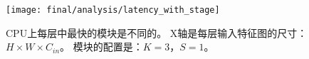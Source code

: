 \begin{figure}
    \centering
    \texttt{[image: final/analysis/latency\_with\_stage]}
    \caption{
        CPU上每层中最快的模块是不同的。
        X轴是每层输入特征图的尺寸：$H \times W \times C_{in}$。
        模块的配置是：$K=3$，$S=1$。
    }
    \label{fig:block_latency_cpu}
\end{figure}
